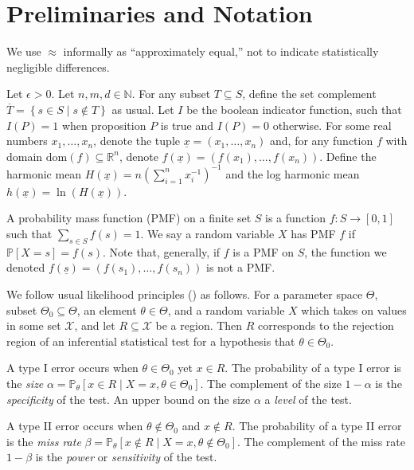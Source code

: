 \documentclass{tran-l}
\theoremstyle{cor}
\theoremstyle{definition}
\theoremstyle{remark}
\theoremstyle{conjecture}
\numberwithin{equation}{section}
\begin{document}
\section{Preliminaries and Notation}\label{sec:preliminaries}

We use $\approx$ informally as ``approximately equal,'' not to indicate statistically negligible differences.

Let $\epsilon > 0$.
Let $n, m, d \in \mathbb{N}$.
For any subset $T \subseteq S$, define the set complement $\overline{T} = \left\{s \in S \mid s \notin T\right\}$ as usual.
Let $I$ be the boolean indicator function, such that $I(P) = 1$ when proposition $P$ is true and $I(P) = 0$ otherwise.
For some real numbers $x_1, \ldots, x_n$, denote the tuple $\underline{x} = (x_1, \ldots, x_n)$ and, for any function $f$ with domain $\text{dom}(f) \subseteq \mathbb{R}^n$, denote $f(\underline{x}) = (f(x_1), \ldots, f(x_n))$.
Define the harmonic mean $H(\underline{x}) = n \left(\sum_{i=1}^{n} x_i^{-1} \right)^{-1}$ and the log harmonic mean $h(\underline{x}) = \ln(H(\underline{x}))$.


A probability mass function (PMF) on a finite set $S$ is a function $f: S \to [0,1]$ such that $\sum_{s \in S} f(s) = 1$.
We say a random variable $X$ has PMF $f$ if $\mathbb{P}[X=s] = f(s)$.
Note that, generally, if $f$ is a PMF on $S$, the function we denoted $f(\underline{s}) = (f(s_1), \ldots, f(s_n))$ is not a PMF.


We follow usual likelihood principles (\cite{casella2024statistical}) as follows.
For a parameter space $\Theta$, subset $\Theta_0 \subseteq \Theta$, an element $\theta \in \Theta$, and a random variable $X$ which takes on values in some set $\mathcal{X}$, and let $R \subseteq \mathcal{X}$ be a region. Then $R$ corresponds to the rejection region of an inferential statistical test for a hypothesis that $\theta \in \Theta_0$.

A type I error occurs when $\theta \in \Theta_0$ yet $x \in R$.
The probability of a type I error is the \textit{size} $\alpha = \mathbb{P}_{\theta}[x \in R \mid X = x, \theta \in \Theta_0]$.
The complement of the size $1-\alpha$ is the \textit{specificity} of the test.
An upper bound on the size $\alpha$ a \textit{level} of the test.

A type II error occurs when $\theta \notin \Theta_0$ and $x \notin R$.
The probability of a type II error is the \textit{miss rate} $\beta = \mathbb{P}_{\theta}[x \notin R \mid X = x, \theta \notin \Theta_0]$.
The complement of the miss rate $1-\beta$ is the \textit{power} or \textit{sensitivity} of the test.
\end{document}
